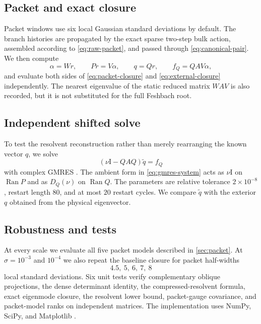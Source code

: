 \documentclass[11pt]{article}
\theoremstyle{definition}
\theoremstyle{remark}
\newcommand{\Id}{\mathrm I}
\newcommand{\Ran}{\operatorname{Ran}}
\begin{document}
\subsection{Packet and exact closure}

Packet windows use six local Gaussian standard deviations by default.  The
branch histories are propagated by the exact sparse two-step bulk action,
assembled according to \eqref{eq:raw-packet}, and passed through
\eqref{eq:canonical-pair}.  We then compute
\begin{equation}
\label{eq:numerical-closure-data}
 \alpha=Wr,
 \qquad Pr=V\alpha,
 \qquad q=Qr,
 \qquad f_Q=QAV\alpha,
\end{equation}
and evaluate both sides of \eqref{eq:packet-closure} and
\eqref{eq:external-closure} independently.  The nearest eigenvalue of the
static reduced matrix $WAV$ is also recorded, but it is not substituted for
the full Feshbach root.

\subsection{Independent shifted solve}

To test the resolvent reconstruction rather than merely rearranging the
known vector $q$, we solve
\begin{equation}
\label{eq:gmres-system}
 (\nu\Id-QAQ)\widetilde q=f_Q
\end{equation}
with complex GMRES \citep{SaadSchultz1986,Saad2003}.  The ambient form in
\eqref{eq:gmres-system} acts as $\nu\Id$ on $\Ran P$ and as $D_Q(\nu)$ on
$\Ran Q$.  The parameters are relative tolerance $2\times10^{-8}$,
restart length $80$, and at most $20$ restart cycles.  We compare
$\widetilde q$ with the exterior $q$ obtained from the physical eigenvector.

\subsection{Robustness and tests}

At every scale we evaluate all five packet models described in
\cref{sec:packet}.  At $\sigma=10^{-3}$ and $10^{-4}$ we also repeat the
baseline closure for packet half-widths
\begin{equation}
\label{eq:window-widths}
 4.5,\ 5,\ 6,\ 7,\ 8
\end{equation}
local standard deviations.  Six unit tests verify complementary oblique
projections, the dense determinant identity, the compressed-resolvent
formula, exact eigenmode closure, the resolvent lower bound, packet-gauge
covariance, and packet-model ranks on independent matrices.  The
implementation uses NumPy, SciPy, and Matplotlib
\citep{HarrisEtAl2020,VirtanenEtAl2020,Hunter2007}.
\end{document}
